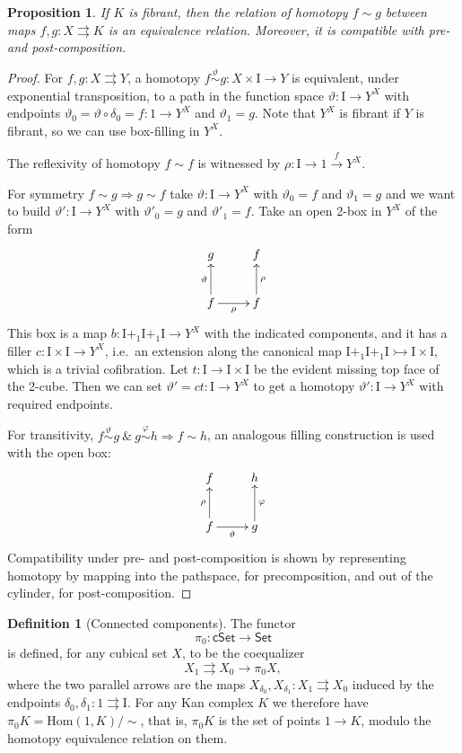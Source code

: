 \documentclass[12pt]{article}
\newcommand{\Set}{\ensuremath{\mathsf{Set}}}
\newcommand{\cSet}{\ensuremath{\mathsf{cSet}}}
\renewcommand{\hom}{\ensuremath{\mathrm{Hom}}}
\newcommand{\mono}{\ensuremath{\rightarrowtail}}
\newcommand{\ra}{\ensuremath{\rightarrow}}
\newcommand{\I}{\ensuremath{\mathrm{I}}}
\newtheorem{proposition}[theorem]{Proposition}
\theoremstyle{remark}
\theoremstyle{definition}
\newtheorem{definition}[theorem]{Definition}
\begin{document}
\begin{proposition}
If $K$ is fibrant, then the relation of homotopy $f \sim g$ between maps $f,g: X\rightrightarrows K$ is an equivalence relation.  Moreover, it is compatible with pre- and post-composition. 
\end{proposition}
\begin{proof}
For $f, g: X\rightrightarrows Y$, a homotopy $f\stackrel{\vartheta}{\sim} g : X\times\I \ra Y$ is equivalent, under exponential transposition, to a path in the function space $\vartheta : \I\ra Y^X$ with endpoints $\vartheta_0 = \vartheta\circ\delta_0 = f: 1\ra Y^X$ and $\vartheta_1 = g$.  Note that $Y^X$ is fibrant if $Y$ is fibrant, so we can use box-filling in $Y^X$.    

The reflexivity of homotopy $f\sim f$ is witnessed by $\rho:\I \ra 1 \stackrel{f}{\ra} Y^X$.  

For symmetry $f\sim g\Rightarrow g\sim f$ take $\vartheta : \I\ra Y^X$ with $\vartheta_0 = f$ and $\vartheta_1 = g$ and we want to build $\vartheta' : \I\ra Y^X$ with $\vartheta'_0 = g$ and $\vartheta'_1 = f$. Take an open 2-box in $Y^X$ of the form
\begin{equation*}%
\xymatrix{
g  & f  \\
f \ar[u]^{\vartheta} \ar[r]_\rho & f \ar[u]_\rho
}
\end{equation*}
This box is a map $b : \I+_1 \I +_1 \I \ra Y^X$ with the indicated components, and it has a filler $c : \I\times \I \ra Y^X$, i.e.\ an extension along the canonical map $\I+_1 \I +_1 \I \mono \I\times\I$, which is a trivial cofibration.  Let $t : \I\ra \I\times\I$ be the evident missing top face of the 2-cube.  Then we can set $\vartheta' = ct : \I \ra Y^X$ to get a homotopy $\vartheta' : \I\ra Y^X$ with required endpoints.

For transitivity, $f\stackrel{\vartheta}{\sim} g\ \&\ g\stackrel{\varphi}{\sim} h\Rightarrow f\sim h$, an analogous filling construction is used with the open box:
\begin{equation*}%
\xymatrix{
f  & h  \\
f \ar[u]^{\rho} \ar[r]_\vartheta & g \ar[u]_\varphi
}
\end{equation*}
Compatibility under pre- and post-composition is shown by representing homotopy by mapping into the pathspace, for precomposition, and out of the cylinder, for post-composition.
\end{proof}

\begin{definition}[Connected components]
The functor $$\pi_0 : \cSet\ra\Set$$ is defined, for any cubical set $X$, to be the coequalizer $$X_1\rightrightarrows X_0\ra \pi_0X,$$ where the two parallel arrows are the maps $X_{\delta_0}, X_{\delta_1} : X_1 \rightrightarrows X_0$ induced by the endpoints $\delta_0, \delta_1 : 1 \rightrightarrows \I$.   For any Kan complex $K$ we therefore have $\pi_0K = \hom(1,K)/\!\!\sim$, that is, $\pi_0K$ is the set of points $1\ra K$, modulo the homotopy equivalence relation on them.
\end{definition}
\end{document}
